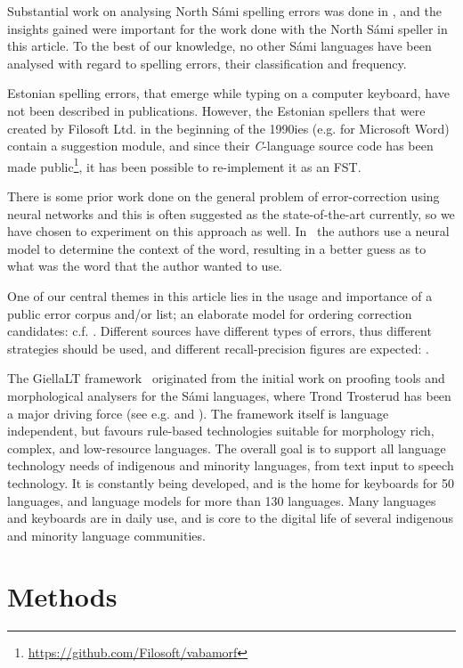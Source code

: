 \documentclass{flammie}
\begin{document}
Substantial work on analysing North Sámi spelling errors was done in
\cite{antonsen2013}, and the insights gained were important for the work done
with the North Sámi speller in this article. To the best of our knowledge, no
other Sámi languages have been analysed with regard to spelling errors, their
classification and frequency.

Estonian spelling errors, that emerge while typing on a computer keyboard, have
not been described in publications. However, the Estonian spellers that were
created by Filosoft Ltd. in the beginning of the 1990ies (e.g. for Microsoft
Word) contain a suggestion module, and since their \textit{C}-language source
code has been made public\footnote{\url{https://github.com/Filosoft/vabamorf}},
it has been possible to re-implement it as an FST.

There is some prior work done on the general problem of error-correction using
neural networks and this is often suggested as the state-of-the-art currently,
so we have chosen to experiment on this approach as well.
In~\cite{li2020context} the authors use a neural model to determine the context
of the word, resulting in a better guess as to what was the word that the author
wanted to use.


One of our central themes in this article lies in the usage and importance of a
public error corpus and/or list; an elaborate model for ordering correction
candidates: c.f.  \cite{flor2019benchmark}.  Different sources have different
types of errors, thus different strategies should be used, and different
recall-precision figures are expected:   \cite{beeksma2018detecting}.

The GiellaLT framework~\cite{moshagen2013building} originated from the initial
work on proofing tools and morphological analysers for the Sámi languages, where
Trond Trosterud has been a major driving force (see e.g. \cite{trosterud2005}
and \cite{trosterud2007}). The framework itself is language independent, but
favours rule-based technologies suitable for morphology rich, complex, and
low-resource languages. The overall goal is to support all language technology
needs of indigenous and minority languages, from text input to speech
technology. It is constantly being developed, and is the home for keyboards for
50 languages, and language models for more than 130 languages. Many languages
and keyboards are in daily use, and is core to the digital life of several
indigenous and minority language communities.

\section{Methods}
\end{document}

